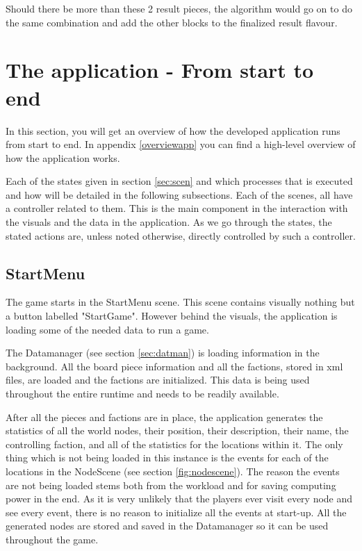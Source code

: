 Should there be more than these 2 result pieces, the algorithm would go on to do the same combination and add the other blocks to the finalized result flavour.

\section{The application - From start to end}
In this section, you will get an overview of how the developed application runs from start to end. 
In appendix \ref{overviewapp} you can find a high-level overview of how the application works.

Each of the states given in section \ref{sec:scen} and which processes that is executed and how will be detailed in the following subsections.
Each of the scenes, all have a controller related to them. This is the main component in the interaction with the visuals and the data in the application. As we go through the states, the stated actions are, unless noted otherwise, directly controlled by such a controller.

\subsection{StartMenu}
The game starts in the StartMenu scene. This scene contains visually nothing but a button labelled "StartGame". 
However behind the visuals, the application is loading some of the needed data to run a game.

The Datamanager (see section \ref{sec:datman}) is loading information in the background. 
All the board piece information and all the factions, stored in xml files, are loaded and the factions are initialized. 
This data is being used throughout the entire runtime and needs to be readily available.

After all the pieces and factions are in place, the application generates the statistics of all the world nodes, their position, their description, their name, the controlling faction, and all of the statistics for the locations within it.
The only thing which is not being loaded in this instance is the events for each of the locations in the NodeScene (see section \ref{fig:nodescene}). The reason the events are not being loaded stems both from the workload and for saving computing power in the end. As it is very unlikely that the players ever visit every node and see every event, there is no reason to initialize all the events at start-up. 
All the generated nodes are stored and saved in the Datamanager so it can be used throughout the game.


